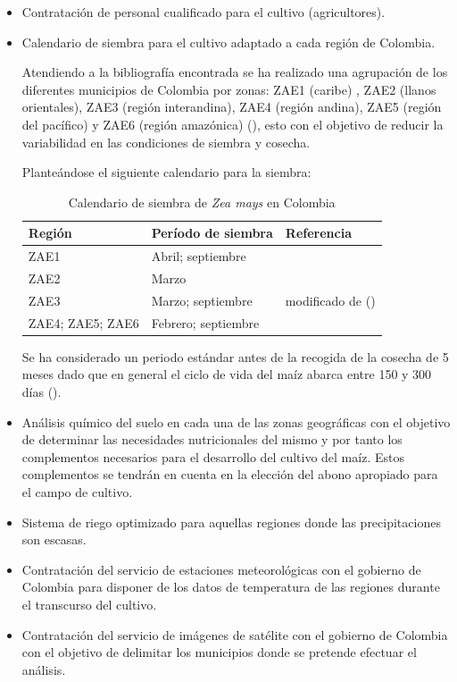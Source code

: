 \documentclass[12pt, spanish]{article}
\begin{document}
\begin{itemize}
    \item Contratación de personal cualificado para el cultivo (agricultores).
    \item Calendario de siembra para el cultivo adaptado a cada región de Colombia.
    
Atendiendo a la bibliografía encontrada se ha realizado una agrupación de los diferentes municipios de Colombia por zonas: ZAE1 (caribe) , ZAE2 (llanos orientales), ZAE3 (región interandina), ZAE4 (región andina), ZAE5 (región del pacífico)  y ZAE6 (región amazónica) (\cite{GarciaA2014}), esto con el objetivo de reducir la variabilidad en las condiciones de siembra y cosecha.

Planteándose el siguiente calendario para la siembra:
\newpage

\begin{table}[h!]
    \centering
    \begin{tabular}{ |p{5cm}|p{5cm}|p{5cm}|  }
        \hline
        Región & Período de siembra & Referencia  \\
        \hline
        ZAE1 & Abril; septiembre &  \\
        ZAE2 & Marzo  &  \\
        ZAE3 & Marzo; septiembre & modificado de (\cite{GarciaA2014})  \\
        ZAE4; ZAE5; ZAE6 & Febrero; septiembre &  \\
        \hline
    \end{tabular}
    \caption{Calendario de siembra de \textit{Zea mays} en Colombia}
    \label{tab:1}
\end{table}



Se ha considerado un periodo estándar antes de la recogida de la cosecha de 5 meses dado que en general el ciclo de vida del maíz abarca entre 150 y 300 días (\cite{Lafitte2001}).

\item Análisis químico del suelo en cada una de las zonas geográficas con el objetivo de determinar las necesidades nutricionales del mismo y por tanto los complementos necesarios para el desarrollo del cultivo del maíz. Estos complementos se tendrán en cuenta en la elección del abono apropiado para el campo de cultivo.

\item Sistema de riego optimizado para aquellas regiones donde las precipitaciones son escasas.

\item Contratación del servicio de estaciones meteorológicas con el gobierno de Colombia para disponer de los datos de temperatura de las regiones durante el transcurso del cultivo.

\item Contratación del servicio de imágenes de satélite con el gobierno de Colombia con el objetivo de delimitar los municipios donde se pretende efectuar el análisis. 

\end{itemize}
\end{document}
